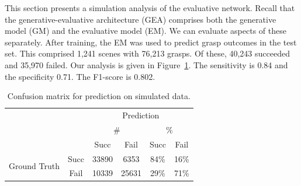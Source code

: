 This section presents a simulation analysis of the evaluative network. Recall that the generative-evaluative architecture (GEA) comprises both the generative model (GM) and the evaluative model (EM). We can evaluate aspects of these separately. After training, the EM was used to predict grasp outcomes in the test set. This comprised 1,241 scenes with 76,213 grasps. Of these, 40,243 succeeded and 35,970 failed. Our analysis is given in Figure~\ref{fig:predictions}. The sensitivity is 0.84 and the specificity 0.71. The F1-score is 0.802.
\begin{table}[b]
\centering
\caption{Confusion matrix for prediction on simulated data.}
\label{fig:predictions}
\begin{tabular}{|c|c|c|c|c|c|}
\hline
 & & \multicolumn{4}{c|}{Prediction} \\ \cline{3-6}
      & & \multicolumn{2}{c|}{\#} & \multicolumn{2}{c|}{\%} \\ \cline{3-6}
  &  & Succ         & Fail         & Succ         & Fail         \\ \hline
\multirow{ 2}{*}{Ground Truth} \newline & Succ & 33890      & 6353       & 84\%     & 16\%       \\ \cline{2-6}
 &Fail & 10339      &  25631    & 29\%     &  71\%   \\ \hline
\end{tabular}
\end{table}


